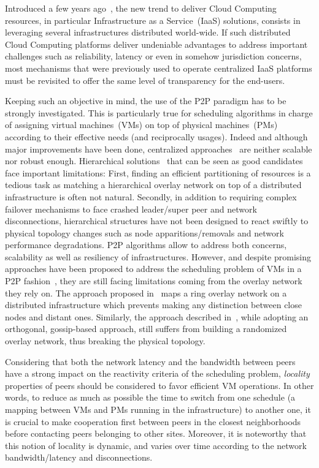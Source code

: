 Introduced a few years ago~\cite{greenberg:sigcomm09}, the new trend to deliver Cloud
Computing resources, in particular Infrastructure as a Service~(IaaS) solutions, consists
in leveraging several infrastructures distributed world-wide. If such distributed Cloud
Computing platforms deliver undeniable advantages to address important challenges such as
reliability, latency or even in somehow jurisdiction concerns, most mechanisms that were
previously used to operate centralized IaaS platforms must be revisited to offer the same
level of transparency for the end-users.

Keeping such an objective in mind, the use of the P2P paradigm has to be strongly
investigated. This is particularly true for scheduling algorithms in charge
of assigning virtual machines~(VMs) on top of physical machines~(PMs) according to their effective needs (and reciprocally
usages). Indeed and although major improvements have been done, centralized
approaches~\cite{hermenier:2013} are neither scalable nor robust enough. Hierarchical
solutions~\cite{feller:ccgrid12} that can be seen as good candidates face important
limitations: First, finding an efficient partitioning of resources is a tedious task as
matching a hierarchical overlay network on top of a distributed infrastructure is often not
natural. Secondly, in addition to requiring complex failover mechanisms to face
crashed leader/super peer and network disconnections, hierarchical structures have not
been designed to react swiftly to physical topology changes such as node
apparitions/removals and network performance degradations. P2P algorithms allow to
address both concerns, \ie scalability as well as resiliency of infrastructures. However,
and despite promising approaches have been proposed to address the scheduling problem of
VMs in a P2P fashion~\cite{quesnel:cpe2012,feller:cloudcom12}, they are still facing
limitations coming from the overlay network they rely on. The approach proposed
in~\cite{quesnel:cpe2012} maps a ring overlay network on a distributed infrastructure which
prevents making any distinction between close nodes and distant ones. Similarly, the
approach described in~\cite{feller:cloudcom12}, while adopting an orthogonal, gossip-based approach,
still suffers from building a randomized overlay network, thus breaking the physical topology.

Considering that both the network latency and the bandwidth between peers have a strong
impact on the reactivity criteria of the scheduling problem, \emph{locality} properties of
peers should be considered to favor efficient VM operations. In other words, to reduce as
much as possible the time to switch from one schedule (\ie a mapping between VMs and PMs
running in the infrastructure) to another one, it is crucial to make cooperation first
between peers in the closest neighborhoods before contacting peers belonging to other sites.
Moreover, it is noteworthy that this notion of locality is dynamic, and varies over time according
to the network bandwidth/latency and disconnections.

